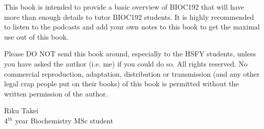 This book is intended to provide a basic overview of BIOC192 that will have more than enough details to tutor BIOC192 students.
It is highly recommended to listen to the podcasts and add your own notes to this book to get the maximal use out of this book.

Please DO NOT send this book around, especially to the HSFY students, unless you have asked the author (i.e. me) if you could do so.
All rights reserved.
No commercial reproduction, adaptation, distribution or transmission (and any other legal crap people put on their books) of this book is permitted without the written permission of the author.

\vspace{5cm}

\noindent
Riku Takei \\
4$^{th}$ year Biochemistry MSc student\\
